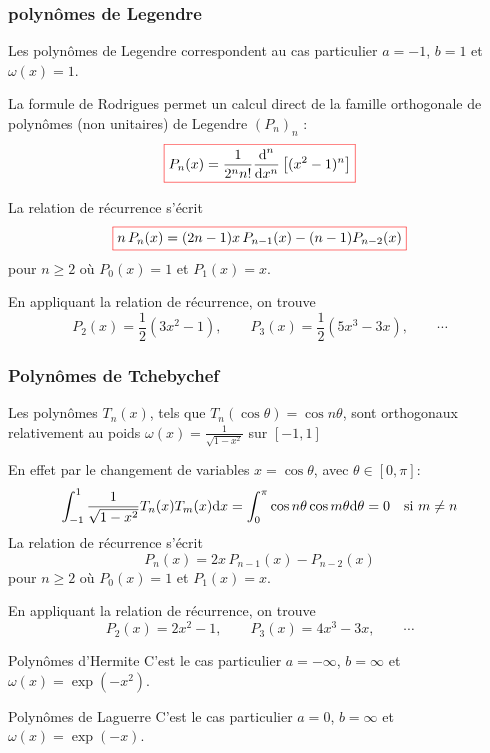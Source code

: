 \documentclass{beamer}
\def \de {{\rm d}}
\newcommand{\myredbox}[1]{\fcolorbox{red}{white}{$\displaystyle#1$}}
\begin{document}
\begin{frame}
\frametitle{polynômes de Legendre}
Les polynômes de Legendre correspondent au cas particulier $a =-1$, $b=1$ et $\omega(x) = 1$.


La formule de Rodrigues permet un calcul direct de la famille orthogonale  de polynômes (non unitaires) de Legendre $(P_n)_n$ :
\[ \myredbox{P_n(x)=\frac 1{2^n n!}\frac{\mbox{d}^n}{\mbox{d}x^n}\left[(x^2-1)^n\right]}\]
 
La relation de récurrence s'écrit
\[\myredbox{n\,P_n(x)=(2n-1)x\,P_{n-1}(x)-(n-1) P_{n-2}(x)}\]
pour $n\geq 2$ où $P_0(x)=1$ et  $P_1(x)=x$. 

En appliquant la relation de récurrence, on trouve
\[P_2(x)=\frac 12\left(3x^2-1\right),\qquad P_3(x)=\frac 12\left(5x^3-3x\right),\qquad  \cdots \]

\end{frame}


\begin{frame}
\frametitle{Polynômes de Tchebychef}
\begin{theorem}
 Les polynômes $T_n(x)$, tels que $T_n(\cos\theta) = \cos n\theta$, sont orthogonaux relativement au poids $\omega(x)=\frac 1{\sqrt{1-x^2}}$ sur $[-1,1]$
\end{theorem}
En effet par le changement de variables $x = \cos\theta$, avec $\theta \in [0, \pi]$:
\[\int_{-1}^1\frac 1{\sqrt{1-x^2}}T_n(x) T_m(x) \de x=\int_0^{\pi}\cos n\theta\cos m\theta \de \theta=0\quad\mbox{si }m\neq n\]
La relation de récurrence s'écrit
\[P_n(x)=2x\,P_{n-1}(x)- P_{n-2}(x)\]
pour $n\geq 2$ où $P_0(x)=1$ et  $P_1(x)=x$. 

En appliquant la relation de récurrence, on trouve
\[P_2(x)=2x^2-1,\qquad P_3(x)=4x^3-3x,\qquad  \cdots \]
\end{frame}


\begin{frame}
\begin{block}{Polynômes d'Hermite}
C'est le cas particulier $a =-\infty$, $b=\infty$ et $\omega(x) = \exp(-x^2)$.
\end{block}

\begin{block}{Polynômes de Laguerre}
C'est le cas particulier $a =0$, $b=\infty$ et $\omega(x) = \exp(-x)$.
\end{block}
\end{frame}
\end{document}
